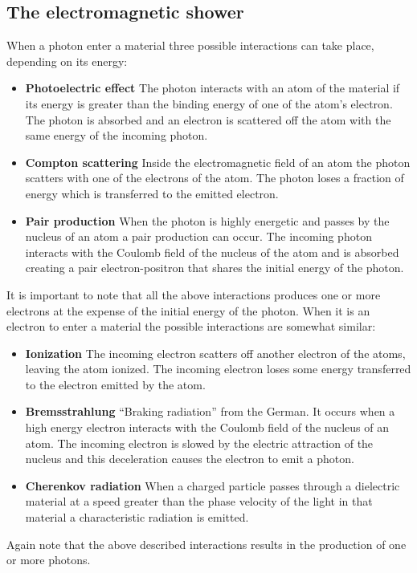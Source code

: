 \subsection{The electromagnetic shower}
When a photon enter a material three possible interactions can take place, depending on its energy:
\begin{itemize}
\item \textbf{Photoelectric effect} The photon interacts with an atom of the material if its energy is greater than the binding energy of one of the atom's electron. The photon is absorbed and an electron is scattered off the atom with the same energy of the incoming photon.
\item \textbf{Compton scattering} Inside the electromagnetic field of an atom the photon scatters with one of the electrons of the atom. The photon loses a fraction of energy which is transferred to the emitted electron.
\item \textbf{Pair production} When the photon is highly energetic and passes by the nucleus of an atom a pair production can occur. The incoming photon interacts with the Coulomb field of the nucleus of the atom and is absorbed creating a pair electron-positron that shares the initial energy of the photon.
\end{itemize}

It is important to note that all the above interactions produces one or more electrons at the expense of the initial energy of the photon.
When it is an electron to enter a material the possible interactions are somewhat similar:
\begin{itemize}
\item \textbf{Ionization} The incoming electron scatters off another electron of the atoms, leaving the atom ionized. The incoming electron loses some energy transferred to the electron emitted by the atom.
\item \textbf{Bremsstrahlung} ``Braking radiation'' from the German. It occurs when a high energy electron interacts with the Coulomb field of the nucleus of an atom. The incoming electron is slowed by the electric attraction of the nucleus and this deceleration causes the electron to emit a photon.
\item \textbf{Cherenkov radiation} When a charged particle passes through a dielectric material at a speed greater than the phase velocity of the light in that material a characteristic radiation is emitted. 
\end{itemize}

Again note that the above described interactions results in the production of one or more photons.\\

